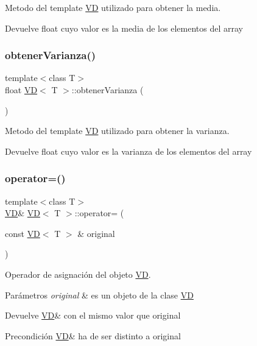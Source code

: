 Metodo del template \hyperlink{classVD}{VD} utilizado para obtener la media. 

\begin{DoxyReturn}{Devuelve}
float cuyo valor es la media de los elementos del array 
\end{DoxyReturn}
\mbox{\label{classVD_a9aa1d47f997319e54e1429363e830ef7}} 
\subsubsection{\texorpdfstring{obtener\+Varianza()}{obtenerVarianza()}}
{\footnotesize\ttfamily template$<$class T$>$ \\
float \hyperlink{classVD}{VD}$<$ T $>$\+::obtener\+Varianza (\begin{DoxyParamCaption}{ }\end{DoxyParamCaption})\hspace{0.3cm}{\ttfamily [inline]}}



Metodo del template \hyperlink{classVD}{VD} utilizado para obtener la varianza. 

\begin{DoxyReturn}{Devuelve}
float cuyo valor es la varianza de los elementos del array 
\end{DoxyReturn}
\mbox{\label{classVD_ad97cd77c2bad24bba0884bacc050f7e5}} 
\subsubsection{\texorpdfstring{operator=()}{operator=()}}
{\footnotesize\ttfamily template$<$class T$>$ \\
\hyperlink{classVD}{VD}\& \hyperlink{classVD}{VD}$<$ T $>$\+::operator= (\begin{DoxyParamCaption}\item[{const \hyperlink{classVD}{VD}$<$ T $>$ \&}]{original }\end{DoxyParamCaption})\hspace{0.3cm}{\ttfamily [inline]}}



Operador de asignación del objeto \hyperlink{classVD}{VD}. 


\begin{DoxyParams}{Parámetros}
{\em original} & es un objeto de la clase \hyperlink{classVD}{VD} \\
\hline
\end{DoxyParams}
\begin{DoxyReturn}{Devuelve}
\hyperlink{classVD}{VD}\& con el mismo valor que original 
\end{DoxyReturn}
\begin{DoxyPrecond}{Precondición}
\hyperlink{classVD}{VD}\& ha de ser distinto a original 
\end{DoxyPrecond}
\mbox{\label{classVD_a7d80240b5791d62b7e27657763afe712}} 
